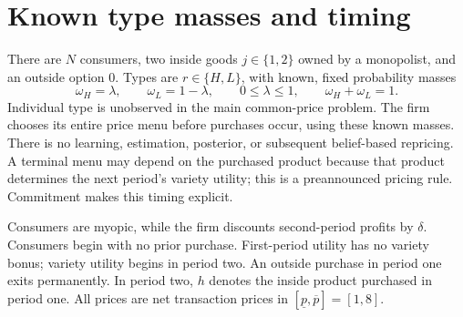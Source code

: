 \documentclass[12pt]{article}
\theoremstyle{definition}
\theoremstyle{remark}
\numberwithin{equation}{section}
\begin{document}
\section{Known type masses and timing}
There are $N$ consumers, two inside goods $j\in\{1,2\}$ owned by a
monopolist, and an outside option $0$. Types are $r\in\{H,L\}$, with known,
fixed probability masses
\[
 \omega_H=\lambda,\qquad \omega_L=1-\lambda,\qquad
 0\leq\lambda\leq1,\qquad \omega_H+\omega_L=1.
\]
Individual type is unobserved in the main common-price problem. The firm
chooses its entire price menu before purchases occur, using these known masses.
There is no learning, estimation, posterior, or subsequent belief-based
repricing. A terminal menu may depend on the purchased product because that
product determines the next period's variety utility; this is a preannounced
pricing rule. Commitment makes this timing explicit.

Consumers are myopic, while the firm discounts second-period profits by
$\delta$. Consumers begin with no prior purchase. First-period utility has
no variety bonus; variety utility begins in period two.
An outside purchase in period one exits permanently. In period two, $h$
denotes the inside product purchased in period one. All prices are net
transaction prices in $[\underline p,\overline p]=[1,8]$.
\end{document}
